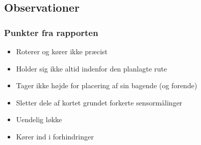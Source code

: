 \subsection{Observationer}

\begin{frame}
\frametitle{Punkter fra rapporten}
\begin{itemize}
\item Roterer og kører ikke præcist
\item Holder sig ikke altid indenfor den planlagte rute
\item Tager ikke højde for placering af sin bagende (og forende)
\item Sletter dele af kortet grundet forkerte sensormålinger
\item Uendelig løkke
\item Kører ind i forhindringer
\end{itemize}
\end{frame}